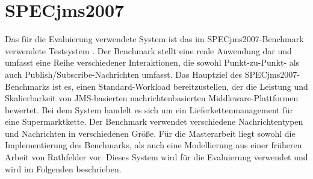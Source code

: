 
\section{SPECjms2007}
\label{sec:specjms}
Das für die Evaluierung verwendete System ist das im SPECjms2007-Benchmark verwendete Testsystem \cite{Sachs2013}. Der Benchmark stellt eine reale Anwendung dar und umfasst eine Reihe verschiedener Interaktionen, die sowohl Punkt-zu-Punkt- als auch Publish/Subscribe-Nachrichten umfasst. Das Hauptziel des SPECjms2007-Benchmarks ist es, einen Standard-Workload bereitzustellen, der die Leistung und Skalierbarkeit von JMS-basierten nachrichtenbasierten Middleware-Plattformen bewertet. Bei dem System handelt es sich um ein Lieferkettenmanagement für eine Supermarktkette. Der Benchmark verwendet verschiedene Nachrichtentypen und Nachrichten in verschiedenen Größe. Für die Masterarbeit liegt sowohl die Implementierung des Benchmarks, als auch eine Modellierung aus einer früheren Arbeit von Rathfelder \cite{Rathfelder2013} vor. Dieses System wird für die Evaluierung verwendet und wird im Folgenden beschrieben. 

